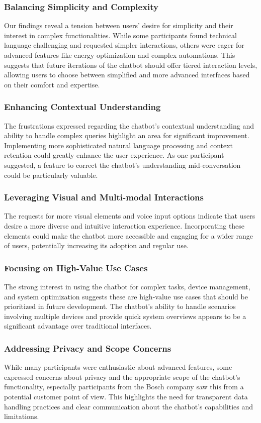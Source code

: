 \subsubsection{Balancing Simplicity and Complexity}
Our findings reveal a tension between users' desire for simplicity and their interest in complex functionalities. While some participants found technical language challenging and requested simpler interactions, others were eager for advanced features like energy optimization and complex automations. This suggests that future iterations of the chatbot should offer tiered interaction levels, allowing users to choose between simplified and more advanced interfaces based on their comfort and expertise.
\subsubsection{Enhancing Contextual Understanding}
The frustrations expressed regarding the chatbot's contextual understanding and ability to handle complex queries highlight an area for significant improvement. Implementing more sophisticated natural language processing and context retention could greatly enhance the user experience. As one participant suggested, a feature to correct the chatbot's understanding mid-conversation could be particularly valuable.
\subsubsection{Leveraging Visual and Multi-modal Interactions}
The requests for more visual elements and voice input options indicate that users desire a more diverse and intuitive interaction experience. Incorporating these elements could make the chatbot more accessible and engaging for a wider range of users, potentially increasing its adoption and regular use.
\subsubsection{Focusing on High-Value Use Cases}
The strong interest in using the chatbot for complex tasks, device management, and system optimization suggests these are high-value use cases that should be prioritized in future development. The chatbot's ability to handle scenarios involving multiple devices and provide quick system overviews appears to be a significant advantage over traditional interfaces.
\subsubsection{Addressing Privacy and Scope Concerns}
While many participants were enthusiastic about advanced features, some expressed concerns about privacy and the appropriate scope of the chatbot's functionality, especially participants from the Bosch company saw this from a  potential customer point of view. This highlights the need for transparent data handling practices and clear communication about the chatbot's capabilities and limitations.

